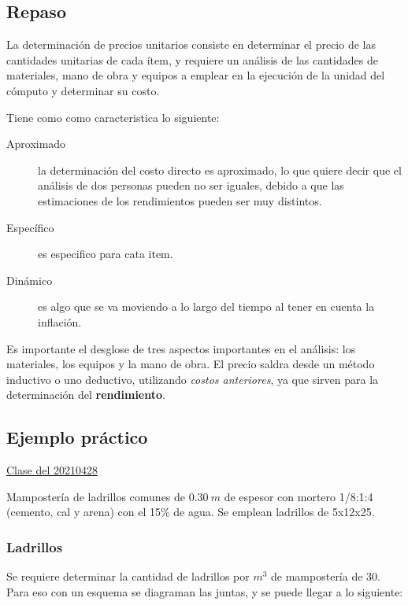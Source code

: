\documentclass[../main.tex]{subfiles}
\begin{document}
 \subsection{Repaso}

 La determinación de precios unitarios consiste en determinar el precio de las 
 cantidades unitarias de cada ítem, y requiere un análisis de las cantidades
 de materiales, mano de obra y equipos a emplear en la ejecución de la unidad del
 cómputo y determinar su costo.

 Tiene como como caracteristica lo siguiente:

 \begin{description}
   \item[Aproximado] la determinación del costo directo es aproximado, lo que 
     quiere decir que el análisis de dos personas pueden no ser iguales, debido
     a que las estimaciones de los rendimientos pueden ser muy distintos.

   \item[Específico] es especifico para cata item.

    \item[Dinámico] es algo que se va moviendo a lo largo del tiempo al tener en
      cuenta la inflación.
 \end{description}

 Es importante el desglose de tres aspectos importantes en el análisis: los 
 materiales, los equipos y la mano de obra. El precio saldra desde un método
 inductivo o uno deductivo, utilizando \textit{costos anteriores}, ya que 
 sirven para la determinación del \textbf{rendimiento}.

 \subsection{Ejemplo práctico}
 
\href{https://youtu.be/Wxb7mm8b-uI}{Clase del 20210428}

 Mampostería de ladrillos comunes de $\SI{0.30}{m}$ de espesor con mortero 
 1/8:1:4 (cemento, cal y arena) con el 15\% de agua. Se emplean ladrillos de
 5x12x25. 

\subsubsection{Ladrillos}

 Se requiere determinar la cantidad de ladrillos por $m^3$ de mampostería de 30.
 Para eso con un esquema se diagraman las juntas, y se puede llegar a lo siguiente:
\end{document}
